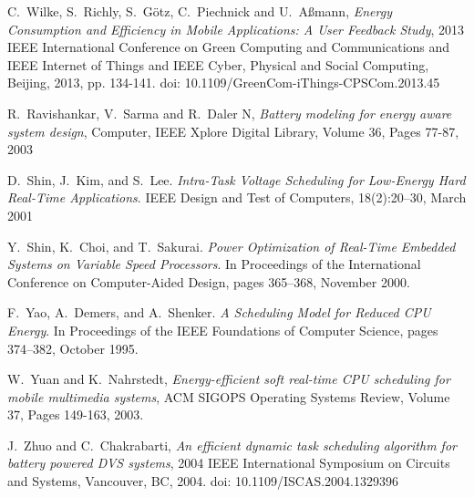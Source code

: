 \documentclass[10pt,article]{IEEEtran}
\begin{document}
\begin{thebibliography}{1}
C.~Wilke, S.~Richly, S.~Götz, C.~Piechnick and U.~Aßmann, \emph{Energy Consumption and Efficiency in Mobile Applications: A User Feedback Study}, 2013 IEEE International Conference on Green Computing and Communications and IEEE Internet of Things and IEEE Cyber, Physical and Social Computing, Beijing, 2013, pp. 134-141.
doi: 10.1109/GreenCom-iThings-CPSCom.2013.45

R.~Ravishankar, V.~Sarma and R.~Daler N, \emph{Battery modeling for energy aware system design},  Computer, IEEE Xplore Digital Library, Volume 36, Pages 77-87, 2003

D.~Shin, J.~Kim, and S.~Lee.  \emph{Intra-Task Voltage Scheduling for Low-Energy Hard Real-Time Applications}. IEEE Design and Test of Computers, 18(2):20–30, March 2001

Y.~Shin, K.~Choi, and  T.~Sakurai. \emph{Power  Optimization  of Real-Time  Embedded  Systems  on  Variable  Speed  Processors}. In Proceedings of the International Conference on Computer-Aided Design, pages 365–368, November 2000.

F.~Yao, A.~Demers, and A.~Shenker. \emph{A Scheduling Model for Reduced CPU Energy}. In Proceedings of the IEEE Foundations of Computer Science, pages 374–382, October 1995.

W.~Yuan and K.~Nahrstedt, \emph{Energy-efficient soft real-time CPU scheduling for mobile multimedia systems},  ACM SIGOPS Operating Systems Review, Volume 37, Pages 149-163, 2003.

J.~Zhuo and C.~Chakrabarti, \emph{An efficient dynamic task scheduling algorithm for battery powered DVS systems}, 2004 IEEE International Symposium on Circuits and Systems, Vancouver, BC, 2004. doi: 10.1109/ISCAS.2004.1329396

\end{thebibliography}

% 
\end{document}
